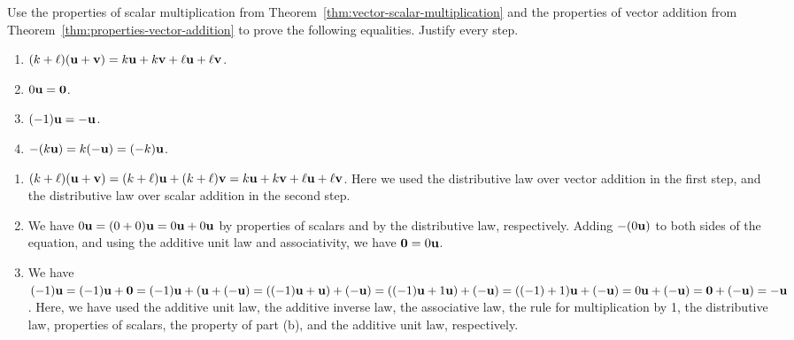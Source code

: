 \begin{ex}
  Use the properties of scalar multiplication from
  Theorem~\ref{thm:vector-scalar-multiplication} and the properties of vector
  addition from Theorem~\ref{thm:properties-vector-addition} to prove
  the following equalities. Justify every step.
  \begin{enumerate}
  \item $(k+\ell)(\vect{u}+\vect{v}) = k\vect{u} + k\vect{v} +
    \ell\vect{u} + \ell\vect{v}$.
  \item $0\vect{u} = \vect{0}$.
  \item $(-1)\vect{u} = -\vect{u}$.
  \item $-(k\vect{u}) = k(-\vect{u}) = (-k)\vect{u}$.
  \end{enumerate}
  \begin{sol}
    \begin{enumerate}
    \item
      $(k+\ell)(\vect{u}+\vect{v}) = (k+\ell)\vect{u} +
      (k+\ell)\vect{v} = k\vect{u} + k\vect{v} + \ell\vect{u} +
      \ell\vect{v}$. Here we used the distributive law over vector
      addition in the first step, and the distributive law over scalar
      addition in the second step.
    \item We have $0\vect{u} = (0+0)\vect{u} = 0\vect{u} + 0\vect{u}$
      by properties of scalars and by the distributive law,
      respectively. Adding $-(0\vect{u})$ to both sides of the
      equation, and using the additive unit law and associativity, we
      have $\vect{0} = 0\vect{u}$.
    \item We have $(-1)\vect{u} = (-1)\vect{u} + \vect{0} =
      (-1)\vect{u} + (\vect{u} + (-\vect{u}) = ((-1)\vect{u} +
      \vect{u}) + (-\vect{u}) = ((-1)\vect{u} + 1\vect{u}) +
      (-\vect{u}) = ((-1)+1)\vect{u} + (-\vect{u}) = 0\vect{u} +
      (-\vect{u}) = \vect{0} + (-\vect{u}) = -\vect{u}$. Here, we have
      used the additive unit law, the additive inverse law, the
      associative law, the rule for multiplication by 1, the
      distributive law, properties of scalars, the property of part
      (b), and the additive unit law, respectively.
    \end{enumerate}
  \end{sol}
\end{ex}

